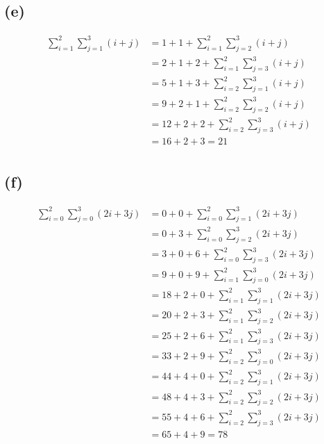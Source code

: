 \documentclass{article}
\begin{document}
\subsection*{(e)}
\begin{equation} \label{eq5}
\begin{split}
\sum\limits_{i=1}^{2}\sum\limits_{j=1}^{3}(i + j) & =  1 + 1 + \sum\limits_{i=1}^{2}\sum\limits_{j=2}^{3}(i + j) \\
& =  2 + 1 + 2 + \sum\limits_{i=1}^{2}\sum\limits_{j=3}^{3}(i + j) \\
& =  5 + 1 + 3 + \sum\limits_{i=2}^{2}\sum\limits_{j=1}^{3}(i + j) \\
& =  9 + 2 + 1 + \sum\limits_{i=2}^{2}\sum\limits_{j=2}^{3}(i + j) \\
& =  12 + 2 + 2 + \sum\limits_{i=2}^{2}\sum\limits_{j=3}^{3}(i + j) \\
& =  16 + 2 + 3 = 21\\
\end{split}
\end{equation}

\subsection*{(f)}
\begin{equation} \label{eq6}
\begin{split}
\sum\limits_{i=0}^{2}\sum\limits_{j=0}^{3}(2i + 3j) & =  0 + 0 + \sum\limits_{i=0}^{2}\sum\limits_{j=1}^{3}(2i + 3j) \\
& =  0 + 3 + \sum\limits_{i=0}^{2}\sum\limits_{j=2}^{3}(2i + 3j) \\
& =  3 + 0 + 6 + \sum\limits_{i=0}^{2}\sum\limits_{j=3}^{3}(2i + 3j) \\
& =  9 + 0 + 9 + \sum\limits_{i=1}^{2}\sum\limits_{j=0}^{3}(2i + 3j) \\
& =  18 + 2 + 0 + \sum\limits_{i=1}^{2}\sum\limits_{j=1}^{3}(2i + 3j) \\
& =  20 + 2 + 3 + \sum\limits_{i=1}^{2}\sum\limits_{j=2}^{3}(2i + 3j) \\
& =  25 + 2 + 6 + \sum\limits_{i=1}^{2}\sum\limits_{j=3}^{3}(2i + 3j) \\
& =  33 + 2 + 9 + \sum\limits_{i=2}^{2}\sum\limits_{j=0}^{3}(2i + 3j) \\
& =  44 + 4 + 0 + \sum\limits_{i=2}^{2}\sum\limits_{j=1}^{3}(2i + 3j) \\
& =  48 + 4 + 3 + \sum\limits_{i=2}^{2}\sum\limits_{j=2}^{3}(2i + 3j) \\
& =  55 + 4 + 6 + \sum\limits_{i=2}^{2}\sum\limits_{j=3}^{3}(2i + 3j) \\
& =  65 + 4 + 9 = 78 \\
\end{split}
\end{equation}
\end{document}
